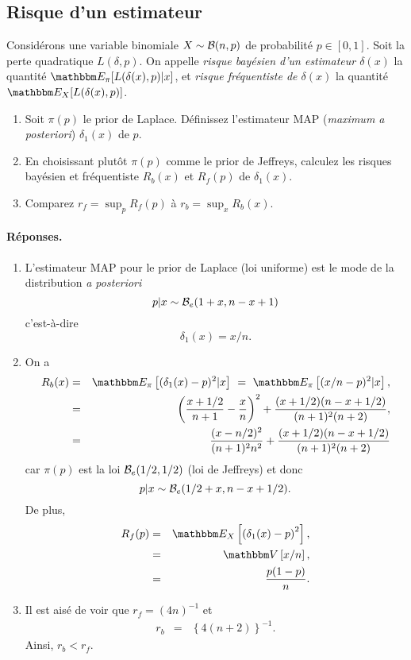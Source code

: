\subsection{Risque d'un estimateur}

Considérons une variable binomiale $X\sim{\cal{B}}(n,p)$ de probabilité $p\in[0,1]$. Soit la perte quadratique $L(\delta,p)$. On appelle {\it risque bayésien d'un estimateur $\delta(x)$} la quantité $\E_{\pi}[L(\delta(x),p)|x]$, et  {\it risque fréquentiste de $\delta(x)$}  la quantité $\E_{X}[L(\delta(x),p)]$.
\begin{enumerate}
\item Soit $\pi(p)$ le prior de Laplace. Définissez l'estimateur MAP ({\it maximum a posteriori}) $\delta_1(x)$ de $p$.
\item En choisissant plutôt $\pi(p)$ comme le prior de Jeffreys, calculez les risques bayésien et fréquentiste $R_b(x)$ et $R_f(p)$ de  $\delta_1(x)$.
\item Comparez $r_f = \sup_p R_f(p)$ à 
$r_b  =  \sup_x R_b(x)$. 
\end{enumerate}

\paragraph{\bf Réponses.}
\begin{enumerate}
\item L'estimateur MAP pour le prior de Laplace (loi uniforme) est le mode de la distribution {\it a posteriori}
$$
p|x \sim {\cal{B}}_e(1+x,n-x+1)
$$
c'est-à-dire
$$
\delta_1(x) = x/n.
$$
\item On a 
\begin{eqnarray*}
R_b(x) &= & \E_{\pi}\left[(\delta_1(x)-p)^2|x\right] \ = \ \E_{\pi}\left[(x/n-p)^2|x\right], \\
& = & \left(\frac{x+1/2}{n+1} - \frac{x}{n}\right)^2 + \frac{(x+1/2)(n-x+1/2)}{(n+1)^2(n+2)}, \\
& = & \frac{(x-n/2)^2}{(n+1)^2 n^2} + \frac{(x+1/2)(n-x+1/2)}{(n+1)^2(n+2)}
\end{eqnarray*}
car $\pi(p)$ est la loi ${\cal{B}}_e(1/2,1/2)$ (loi de Jeffreys) et donc
$$
p|x \sim {\cal{B}}_e(1/2+x,n-x+1/2). 
$$
De plus, 
\begin{eqnarray*}
R_f(p) & = & \E_X\left[\left(\delta_1(x)- p\right)^2\right], \\
& = & \V\left[x/n\right], \\
& = & \frac{p(1-p)}{n}.
\end{eqnarray*}
\item Il est aisé de voir que $r_f =(4n)^{-1}$ et 
\begin{eqnarray*}
r_b  & = & \left\{4(n+2)\right\}^{-1}.
\end{eqnarray*}
Ainsi, $r_b< r_f$. 
\end{enumerate}


